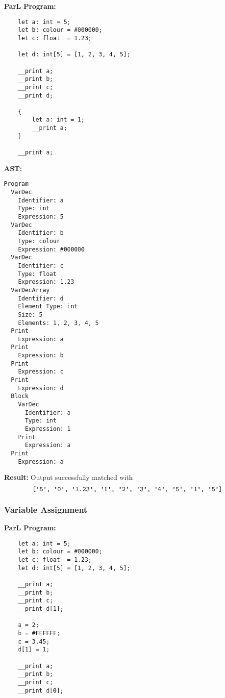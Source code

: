 \textbf{ParL Program:}

\begin{lstlisting}
    let a: int = 5;
    let b: colour = #000000;
    let c: float  = 1.23;

    let d: int[5] = [1, 2, 3, 4, 5];

    __print a;
    __print b;
    __print c;
    __print d;

    {
        let a: int = 1;
        __print a;
    }

    __print a;
\end{lstlisting}

\newpage

\textbf{AST:}

\begin{lstlisting}
Program
  VarDec
    Identifier: a
    Type: int
    Expression: 5
  VarDec
    Identifier: b
    Type: colour
    Expression: #000000
  VarDec
    Identifier: c
    Type: float
    Expression: 1.23
  VarDecArray
    Identifier: d
    Element Type: int
    Size: 5
    Elements: 1, 2, 3, 4, 5
  Print
    Expression: a
  Print
    Expression: b
  Print
    Expression: c
  Print
    Expression: d
  Block
    VarDec
      Identifier: a
      Type: int
      Expression: 1
    Print
      Expression: a
  Print
    Expression: a
\end{lstlisting}

\textbf{Result:}
Output successfully matched with $$\texttt{['5', '0', '1.23', '1', '2', '3', '4',
        '5', '1', '5']}$$

\newpage

\subsubsection*{Variable Assignment}

\textbf{ParL Program:}

\vfill

\begin{lstlisting}
    let a: int = 5;
    let b: colour = #000000;
    let c: float  = 1.23;
    let d: int[5] = [1, 2, 3, 4, 5];

    __print a;
    __print b;
    __print c;
    __print d[1];

    a = 2;
    b = #FFFFFF;
    c = 3.45;
    d[1] = 1;

    __print a;
    __print b;
    __print c;
    __print d[0];
\end{lstlisting}
\vfill

\newpage

